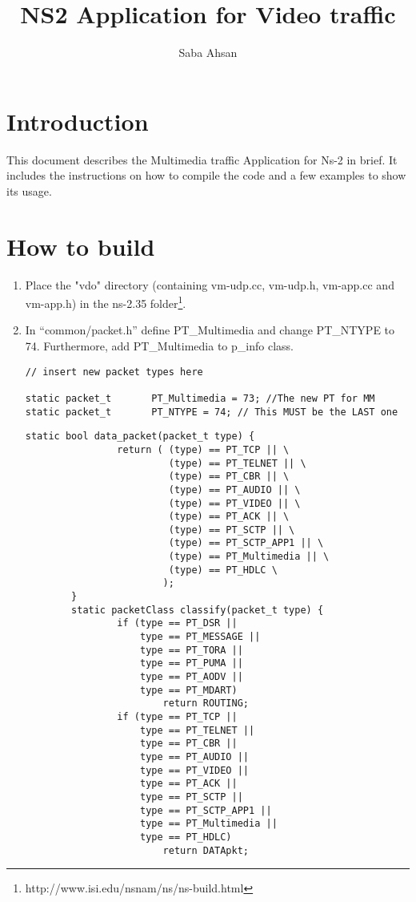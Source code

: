 \documentclass[11pt]{article} %
\title{NS2 Application for Video traffic}
\author{Saba Ahsan}
\begin{document}
\maketitle

\section{Introduction}
This document describes the Multimedia traffic Application for Ns-2 in brief. It includes the instructions on how to compile the code and a few examples to show its usage.

\section{How to build}

\begin{enumerate}
	\item Place the "vdo" directory  (containing vm-udp.cc, vm-udp.h, vm-app.cc and vm-app.h) in the ns-2.35 folder\footnote{http://www.isi.edu/nsnam/ns/ns-build.html}. 

	\item In “common/packet.h” define PT\_Multimedia and change PT\_NTYPE to 74. Furthermore, add PT\_Multimedia to p\_info class. 

\begin{lstlisting}[title="packet.h"]
        // insert new packet types here

static packet_t       PT_Multimedia = 73; //The new PT for MM
static packet_t       PT_NTYPE = 74; // This MUST be the LAST one
\end{lstlisting}

\begin{lstlisting}[title="packet.h"]
        static bool data_packet(packet_t type) {
                return ( (type) == PT_TCP || \
                         (type) == PT_TELNET || \
                         (type) == PT_CBR || \
                         (type) == PT_AUDIO || \
                         (type) == PT_VIDEO || \
                         (type) == PT_ACK || \
                         (type) == PT_SCTP || \
                         (type) == PT_SCTP_APP1 || \
                         (type) == PT_Multimedia || \
                         (type) == PT_HDLC \
                        );
        }
        static packetClass classify(packet_t type) {            
                if (type == PT_DSR || 
                    type == PT_MESSAGE || 
                    type == PT_TORA ||
                    type == PT_PUMA ||
                    type == PT_AODV ||
                    type == PT_MDART)
                        return ROUTING;         
                if (type == PT_TCP || 
                    type == PT_TELNET || 
                    type == PT_CBR || 
                    type == PT_AUDIO || 
                    type == PT_VIDEO || 
                    type == PT_ACK || 
                    type == PT_SCTP || 
                    type == PT_SCTP_APP1 || 
                    type == PT_Multimedia || 
                    type == PT_HDLC)
                        return DATApkt;
\end{lstlisting}



\end{enumerate}
\end{document}
